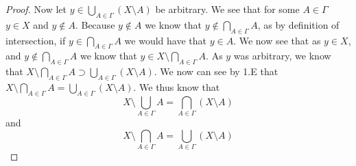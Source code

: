\begin{proof}
Now let $y \in \bigcup_{A\in\Gamma} (X\setminus A)$ be arbitrary. We
see that for some $A \in\Gamma$ $y \in X$ and $y\notin A$. Because
$y\notin A$ we know that $y\notin \bigcap_{A\in\Gamma} A$, as by
definition of intersection, if  $y\in \bigcap_{A\in\Gamma} A$ we would
have that $y\in A$. We now see that as $y\in X$, and $y \notin
\bigcap_{A\in\Gamma} A$ we know that $y \in X \setminus \bigcap_{A \in
  \Gamma} A$. As $y$ was arbitrary, we know that  
$X \setminus \bigcap_{A \in \Gamma} A \supset \bigcup_{A\in\Gamma} 
(X\setminus A)$. We now can see by 1.E that  
$X \setminus \bigcap_{A \in \Gamma} A = \bigcup_{A\in\Gamma}
(X\setminus A)$.
We thus know that 
$$X \setminus \bigcup_{A \in \Gamma} A = \bigcap_{A\in\Gamma} (X \setminus A) $$
and
$$X \setminus \bigcap_{A \in \Gamma} A = \bigcup_{A\in\Gamma} (X \setminus A) $$
\end{proof}